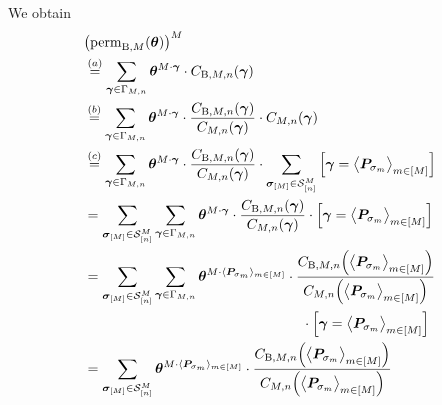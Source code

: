 \documentclass[journal,lettersize,twocolumn]{IEEEtran} %
\newcommand{\vect}[1]{ \bm{#1} }
\newcommand{\set}[1]{\mathcal{#1}}
\newcommand{\vgam}{ \vect{\gamma} }
\newcommand{\matr}[1]{ \bm{#1} }
\newcommand{\perm}{ \mathrm{perm} }
\newcommand{\permbM}[1]{\perm_{ \mathrm{B}, #1 }}
\newcommand{\vsigma}{ \bm{\sigma} }
\newcommand{\setS}{\set{S}}
\newcommand{\CM}[1]{\Cgen{M}{#1}}
\newcommand{\Cgen}[2]{C_{#1,#2}}
\newcommand{\CBM}[1]{\CBgen{M}{#1}}
\newcommand{\CBgen}[2]{C_{\mathrm{B},#1,#2}}
\newcommand{\mtheta}{\matr{\theta}}
\newcommand{\mP}{\matr{P}}
\newcommand{\GamMn}{ \Gamma_{M,n} }
\begin{document}
\begin{appendices}
%

We obtain
\begin{align*}
  &\bigl( \permbM{M}(\mtheta) \bigr)^M \\
    &\overset{(a)}{=}
       \sum\limits_{ \vgam \in \GamMn } 
         \mtheta^{ M \cdot \vgam }
         \cdot
         \CBM{n}( \vgam ) \\
    &\overset{(b)}{=}
       \sum\limits_{ \vgam \in \GamMn } 
         \mtheta^{ M \cdot \vgam }
         \cdot
         \frac{\CBM{n}(\vgam)}
              {\CM{n}( \vgam )}
         \cdot
         \CM{n}( \vgam ) \\
    &\overset{(c)}{=}
       \sum\limits_{ \vgam \in \GamMn } 
         \mtheta^{ M \cdot \vgam }
         \cdot
         \frac{\CBM{n}(\vgam)}
              {\CM{n}( \vgam )}
         \cdot
         \sum_{ \vsigma_{[M]} \in \setS_{[n]}^{M} }
           \left[ 
             \vgam = \bigl\langle \mP_{\sigma_{m}} \bigr\rangle_{m \in [M]}
           \right] \\
    &= \sum_{ \vsigma_{[M]} \in \setS_{[n]}^{M} }
         \sum\limits_{ \vgam \in \GamMn } 
           \mtheta^{ M \cdot \vgam }
           \cdot
           \frac{\CBM{n}(\vgam)}
                {\CM{n}( \vgam )}
           \cdot
           \left[ 
             \vgam = \bigl\langle \mP_{\sigma_{m}} \bigr\rangle_{m \in [M]}
           \right] \\
    &= \sum_{ \vsigma_{[M]} \in \setS_{[n]}^{M} }
         \sum\limits_{ \vgam \in \GamMn } 
           \mtheta^{ M \cdot \langle \mP_{\sigma_{m}} \rangle_{m \in [M]}}
           \cdot
           \frac{\CBM{n}\Bigl(
                          \bigl\langle \mP_{\sigma_{m}} \bigr\rangle_{m \in [M]}
                        \Bigr)}
                {\CM{n}\Bigl(
                         \bigl\langle \mP_{\sigma_{m}} \bigr\rangle_{m \in [M]}
                       \Bigr)} \\
    &\hspace{5.5cm}
           \cdot
           \left[ 
             \vgam = \bigl\langle \mP_{\sigma_{m}} \bigr\rangle_{m \in [M]}
           \right] \\
    &= \sum_{ \vsigma_{[M]} \in \setS_{[n]}^{M} }
         \mtheta^{ M \cdot \langle \mP_{\sigma_{m}} \rangle_{m \in [M]}}
         \cdot
         \frac{\CBM{n}\Bigl(
                        \bigl\langle \mP_{\sigma_{m}} \bigr\rangle_{m \in [M]}
                      \Bigr)}
              {\CM{n}\Bigl(
                        \bigl\langle \mP_{\sigma_{m}} \bigr\rangle_{m \in [M]}
                      \Bigr)} \\

\end{align*}
\end{appendices}
\end{document}
